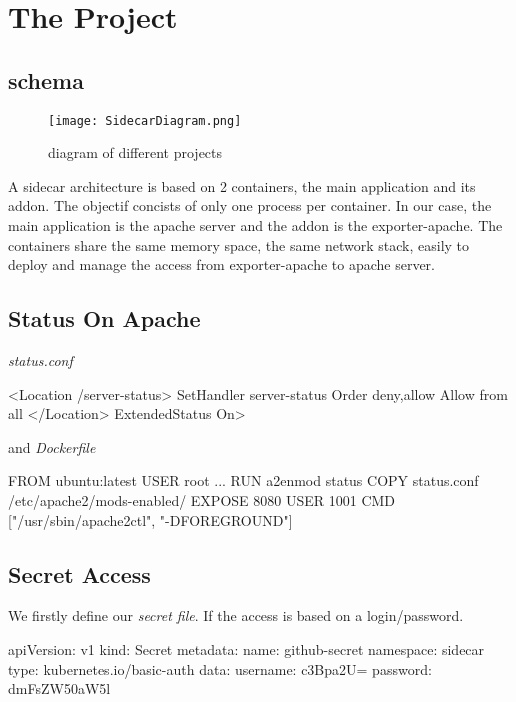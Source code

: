 \section{The Project}

\subsection{schema}

\begin{figure}[ht]
  \caption{diagram of different projects}
  \centering
  \texttt{[image: SidecarDiagram.png]}
  \label{fig:SidecarDiagram}
\end{figure}

A sidecar architecture is based on 2 containers, the main application and its addon. The objectif concists of only one process per container. In our case, the main application is the apache server and the addon is the exporter-apache. The containers share the same memory space, the same network stack, easily to deploy and manage the access from exporter-apache to apache server.
\subsection{Status On Apache}

\emph{status.conf}
\begin{apachecode}
  <Location /server-status>
  SetHandler server-status
  Order deny,allow
  Allow from all
  </Location> ExtendedStatus On>
\end{apachecode}

and  \emph{Dockerfile}

\begin{dockercode}
  FROM ubuntu:latest
  USER root
  ...
  RUN a2enmod status
  COPY status.conf /etc/apache2/mods-enabled/
  EXPOSE 8080
  USER 1001
  CMD ["/usr/sbin/apache2ctl", "-DFOREGROUND"]
\end{dockercode}

\subsection{Secret Access}

We firstly define our \emph{secret file}. If the access is based on a login/password.

\begin{yamlcode}
  apiVersion: v1
  kind: Secret
  metadata:
  name: github-secret
  namespace: sidecar
  type: kubernetes.io/basic-auth
  data:
  username: c3Bpa2U=
  password: dmFsZW50aW5l
\end{yamlcode}

